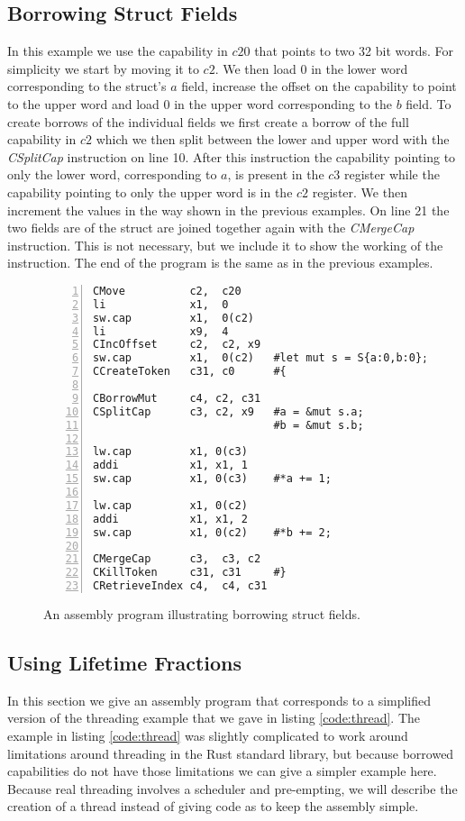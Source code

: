 \subsection{Borrowing Struct Fields}
In this example we use the capability in $c20$ that points to two 32 bit words.
For simplicity we start by moving it to $c2$.
We then load 0 in the lower word corresponding to the struct's $a$ field, increase the offset on the capability to point to the upper word and load 0 in the upper word corresponding to the $b$ field.
To create borrows of the individual fields we first create a borrow of the full capability in $c2$ which we then split between the lower and upper word with the \textit{CSplitCap} instruction on line 10.
After this instruction the capability pointing to only the lower word, corresponding to $a$, is present in the $c3$ register while the capability pointing to only the upper word is in the $c2$ register.
We then increment the values in the way shown in the previous examples.
On line 21 the two fields are of the struct are joined together again with the \textit{CMergeCap} instruction.
This is not necessary, but we include it to show the working of the instruction.
The end of the program is the same as in the previous examples.

\begin{figure}[h]
\begin{lstlisting}[style=custASM, numbers = left ,xleftmargin=1.5em]
CMove          c2,  c20
li             x1,  0
sw.cap         x1,  0(c2)
li             x9,  4
CIncOffset     c2,  c2, x9
sw.cap         x1,  0(c2)   #let mut s = S{a:0,b:0};
CCreateToken   c31, c0      #{

CBorrowMut     c4, c2, c31
CSplitCap      c3, c2, x9   #a = &mut s.a;
                            #b = &mut s.b;

lw.cap         x1, 0(c3)
addi           x1, x1, 1
sw.cap         x1, 0(c3)    #*a += 1;

lw.cap         x1, 0(c2)
addi           x1, x1, 2
sw.cap         x1, 0(c2)    #*b += 2;

CMergeCap      c3,  c3, c2
CKillToken     c31, c31     #}
CRetrieveIndex c4,  c4, c31
\end{lstlisting}
\caption{An assembly program illustrating borrowing struct fields.}
\label{fig:asmstructexample}
\end{figure}

\subsection{Using Lifetime Fractions}
In this section we give an assembly program that corresponds to a simplified version of the threading example that we gave in listing \ref{code:thread}.
The example in listing \ref{code:thread} was slightly complicated to work around limitations around threading in the Rust standard library, but because borrowed capabilities do not have those limitations we can give a simpler example here.
Because real threading involves a scheduler and pre-empting, we will describe the creation of a thread instead of giving code as to keep the assembly simple.

